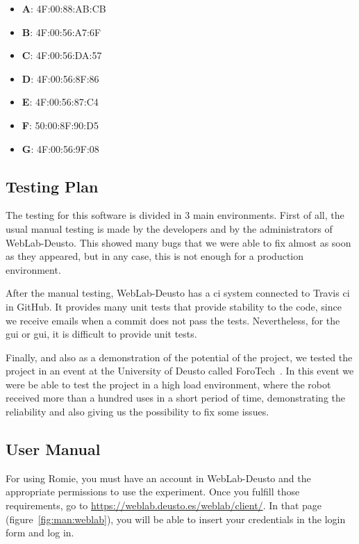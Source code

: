 \begin{itemize}
	\item \textbf{A}: 4F:00:88:AB:CB
	\item \textbf{B}: 4F:00:56:A7:6F
	\item \textbf{C}: 4F:00:56:DA:57
	\item \textbf{D}: 4F:00:56:8F:86
	\item \textbf{E}: 4F:00:56:87:C4
	\item \textbf{F}: 50:00:8F:90:D5
	\item \textbf{G}: 4F:00:56:9F:08
\end{itemize}

\subsection{Testing Plan}

The testing for this software is divided in 3 main environments. First of all, the usual manual
testing is made by the developers and by the administrators of WebLab-Deusto. This showed many bugs
that we were able to fix almost as soon as they appeared, but in any case, this is not enough
for a production environment.

After the manual testing, WebLab-Deusto has a \acrlong{ci} system connected to Travis \acrshort{ci}
in GitHub. It provides many unit tests that provide stability to the code, since we receive emails
when a commit does not pass the tests. Nevertheless, for the \acrlong{gui} or \acrshort{gui}, it is
difficult to provide unit tests.

Finally, and also as a demonstration of the potential of the project, we tested the project in an
event at the University of Deusto called ForoTech~\cite{forotech}. In this event we were be able to
test the project in a high load environment, where the robot received more than a hundred uses in a
short period of time, demonstrating the reliability and also giving us the possibility to fix some
issues.

\subsection{User Manual}

For using Romie, you must have an account in WebLab-Deusto and the appropriate permissions to use
the experiment. Once you fulfill those requirements, go to
\url{https://weblab.deusto.es/weblab/client/}. In that page (figure~\ref{fig:man:weblab}), you will
be able to insert your credentials in the login form and log in.

